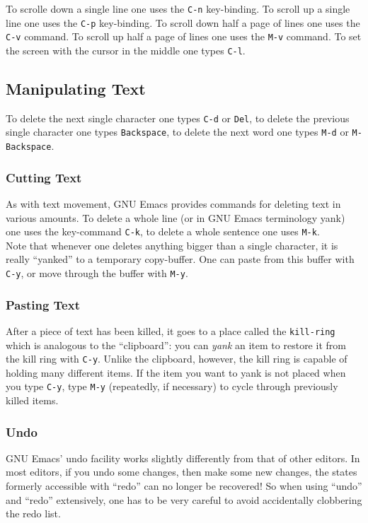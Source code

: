 \documentclass[12pt,a4paper,oneside]{article}
\begin{document}
To scrolle down a single line one uses the \texttt{C-n} key-binding.  To scroll up a single line one uses the \texttt{C-p} key-binding.  To scroll down half a page of lines one uses the \texttt{C-v} command.  To scroll up half a page of lines one uses the \texttt{M-v} command.  To set the screen with the cursor in the middle one types \texttt{C-l}.

\subsection{Manipulating Text}
To delete the next single character one types \texttt{C-d} or \texttt{Del}, to delete the previous single character one types \texttt{Backspace}, to delete the next word one types \texttt{M-d} or \texttt{M-Backspace}.

\subsubsection{Cutting Text}
As with text movement, GNU Emacs provides commands for deleting text in various amounts. To delete a whole line (or in GNU Emacs terminology yank) one uses the key-command \texttt{C-k}, to delete a whole sentence one uses \texttt{M-k}.\\

Note that whenever one deletes anything bigger than a single character, it is really ``yanked'' to a temporary copy-buffer. One can paste from this buffer with \texttt{C-y}, or move through the buffer with \texttt{M-y}.

\subsubsection{Pasting Text}
After a piece of text has been killed, it goes to a place called the \texttt{kill-ring} which is analogous to the ``clipboard'': you can \emph{yank} an item to restore it from the kill ring with \texttt{C-y}. Unlike the clipboard, however, the kill ring is capable of holding many different items. If the item you want to yank is not placed when you type \texttt{C-y}, type \texttt{M-y} (repeatedly, if necessary) to cycle through previously killed items.

\subsubsection{Undo}
GNU Emacs' undo facility works slightly differently from that of other editors. In most editors, if you undo some changes, then make some new changes, the states formerly accessible with ``redo'' can no longer be recovered! So when using ``undo'' and ``redo'' extensively, one has to be very careful to avoid accidentally clobbering the redo list.\\
\end{document}
